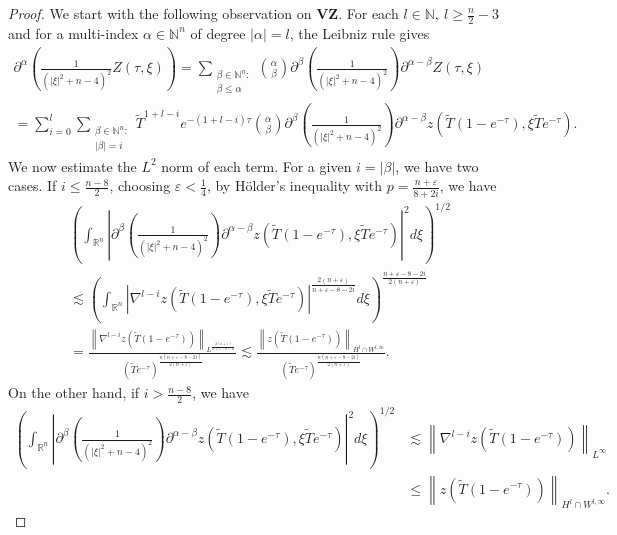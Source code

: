 \documentclass[10pt,a4paper]{amsart}
\def\N{{\mathbb N}}
\newcommand{\R}{\mathbb{R}}
\newcommand{\eps}{\varepsilon}
\newcommand{\norm}[1]{\left\|#1\right\|}
\begin{document}
	\begin{proof}
		We start with the following observation on $\mathbf{V}\mathbf{Z}$. For each $l\in \N,\ l\geq \frac{n}{2}-3$ and for a multi-index $\alpha\in\mathbb{N}^n$ of degree $\lvert \alpha\rvert=l$, the Leibniz rule gives
		\begin{multline*}
			\partial^{\alpha}\left(\frac{1}{(\lvert\xi\rvert^2+n-4)^2}Z(\tau,\xi)\right)=\sum_{\substack{\beta\in \mathbb{N}^n:\\ \beta\leq \alpha}} \binom{\alpha}{\beta}\partial^{\beta}\left(\frac{1}{(\lvert\xi\rvert^2+n-4)^2}\right)\partial^{\alpha-\beta}Z(\tau,\xi)\\
			=\sum_{i=0}^l \sum_{\substack{\beta\in \mathbb{N}^n:\\ \lvert \beta\rvert=i}}\tilde{T}^{1+l-i} e^{-(1+l-i)\tau}\binom{\alpha}{\beta} \partial^{\beta}\left(\frac{1}{(\lvert\xi\rvert^2+n-4)^2}\right)\partial^{\alpha-\beta} z (\tilde{T}(1-e^{-\tau}),\xi \tilde{T} e^{-\tau}).
		\end{multline*}
        We now estimate the $L^2$ norm of each term. For a given $i=\lvert \beta\rvert$, we have two cases.
		If $i\leq  \frac{n-8}{2}$, choosing $\eps <\frac{1}{4}$, by H\"older's inequality with $p=\frac{n+\eps}{8+2i}$, we have
		\begin{multline*}
			\left(\int_{\R^n}\left\lvert\partial^{\beta}\left(\frac{1}{(\lvert\xi\rvert^2+n-4)^2}\right) \partial^{\alpha-\beta}z (\tilde{T}(1-e^{-\tau}),\xi \tilde{T} e^{-\tau})\right\rvert^2 d\xi\right)^{1/2}\\ \lesssim \left(\int_{\R^n}\left\lvert\nabla^{l-i}z (\tilde{T}(1-e^{-\tau}),\xi \tilde{T} e^{-\tau})\right\rvert^\frac{2(n+\eps)}{n+\eps-8-2i} d\xi\right)^{\frac{n+\eps-8-2i}{2(n+\eps)}}\\  =\frac{\norm{\nabla^{l-i}z(\tilde{T}(1-e^{-\tau}))}_{L^{\frac{2(n+\eps)}{n+\eps-8-2i}}}}{(\tilde{T} e^{-\tau})^{\frac{n(n+\eps-8-2i)}{2(n+\eps)}}}  \lesssim \frac{\norm{z(\tilde{T}(1-e^{-\tau}))}_{H^l\cap W^{l,\infty}}}{(\tilde{T} e^{-\tau})^{\frac{n(n+\eps-8-2i)}{2(n+\eps)}}}.
		\end{multline*}
		On the other hand, if $i> \frac{n-8}{2}$, we have
		\begin{align*}
			\left(\int_{\R^n}\left\lvert\partial^{\beta}\left(\frac{1}{(\lvert\xi\rvert^2+n-4)^2}\right)\partial^{\alpha-\beta}z (\tilde{T}(1-e^{-\tau}),\xi \tilde{T} e^{-\tau})\right\rvert^2 d\xi\right)^{1/2}&\lesssim \norm{\nabla^{l-i}z(\tilde{T}(1-e^{-\tau}))}_{L^\infty}\\ &\leq \norm{z(\tilde{T}(1-e^{-\tau}))}_{H^l\cap W^{l,\infty}}.

\end{align*}
\end{proof}
\end{document}
